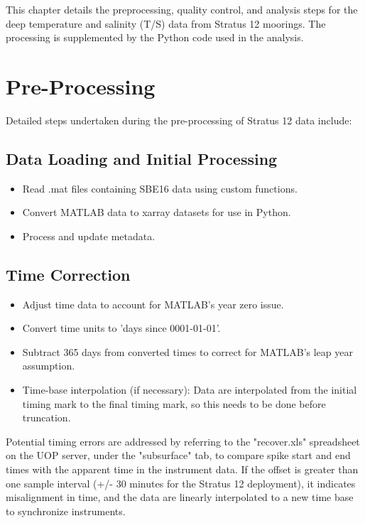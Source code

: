 \documentclass[11pt]{article}
\newcommand{\projectname}{Stratus}  %
\newcommand{\casenumber}{12}  %
\newcommand{\FirstInstrumentType}{SBE16}  %
\begin{document}
This chapter details the preprocessing, quality control, 
and analysis steps for the deep temperature and salinity (T/S) data from \projectname{} \casenumber{} moorings.
The processing is supplemented by the Python code used in the analysis.

\section{Pre-Processing}
Detailed steps undertaken during the pre-processing of \projectname{} \casenumber{} data include:

\subsection{Data Loading and Initial Processing}
\begin{itemize}
\item Read .mat files containing \FirstInstrumentType{} data using custom functions.
\item Convert MATLAB data to xarray datasets for use in Python.
\item Process and update metadata.
\end{itemize}

\subsection{Time Correction}
\begin{itemize}
\item Adjust time data to account for MATLAB's year zero issue.
\item Convert time units to 'days since 0001-01-01'.
\item Subtract 365 days from converted times to correct for MATLAB's leap year assumption.
\item Time-base interpolation (if necessary): Data are interpolated from the initial timing mark to the final timing mark, 
so this needs to be done before truncation.
\end{itemize}

Potential timing errors are addressed by referring to the "recover.xls" spreadsheet on the UOP server, 
under the "subsurface" tab, to compare spike start and end times with the apparent time in the instrument data. 
If the offset is greater than one sample interval (+/- 30 minutes for the Stratus 12 deployment),
it indicates misalignment in time, and the data are linearly interpolated to a new time base to synchronize instruments.
\end{document}
